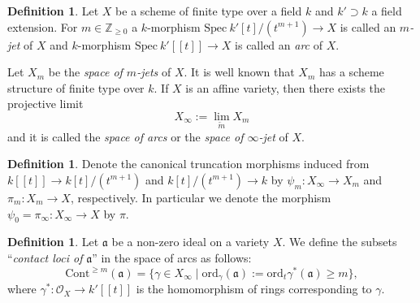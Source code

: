 \documentclass[a4paper]{amsart}
\def\ZZ{{\mathbb{Z}}}
\renewcommand{\a}{{\mathfrak{a}}}
\newcommand{\oo}{{\mathcal O}}
\newcommand{\mld}{{\mathrm{mld}}}
\newcommand{\cont}{{\mathrm{Cont}}}
\newcommand{\ord}{{\mathrm{ord}}}
\newcommand{\spec}{{\mathrm{Spec \ }}}
\newcommand{\m}{{\mathfrak{m}}}
\newcommand{\lct}{{\operatorname{lct}}}
\theoremstyle{definition}
\newtheorem{defn}[thm]{Definition}
\newtheorem{rem}[thm]{Remark}
\begin{document}
   



\begin{defn}
  
 Let \( X \) be a scheme of finite type over a field $k$ and  $k'\supset k$ a field extension.
For  \( m\in \ZZ_{\geq 0} \) a \( k \)-morphism \( \spec k'[t]/(t^{m+1})\to X \) is called an  {\it{\( m \)-jet}} of \( X \) and 
 \( k \)-morphism \( \spec k'[[t]]\to X \) is called an {\sl {arc}} of \( X \).
\end{defn}



Let 
 \( X_{m} \) be the {\sl space of \( m \)-jets} 
   of  \( X \). 
   It is well known that $X_m$ has a scheme structure of finite type over $k$.
   If $X$ is an affine variety, then there exists the projective limit $$X_\infty:=\lim_{\overleftarrow {m}} X_m$$
   and it is called the {\sl space of arcs} or the {\sl space of $\infty$-jet} of $X$.
\begin{defn}
    Denote the canonical truncation morphisms induced from $k[[t]]\to k[t]/(t^{m+1})$ 
    and $k[t]/(t^{m+1})\to k$  by
    $\psi_m: X_\infty\to X_m$ and $\pi_m: X_m\to X$, respectively.
    In particular we denote the  morphism  $\psi_0=\pi_\infty : X_\infty \to X$ by $\pi$.
    
\end{defn}     
 

\begin{defn} Let  $\a$ be a non-zero ideal on 
       a variety $X$.
        We define the subsets ``{\sl contact loci of }$\a$''  in the space of arcs  as follows:
       $$\cont^{\geq m}(\a)=\{\gamma \in X_\infty \mid \ord_\gamma(\a):=\ord_t  
       \gamma^*(\a)\geq m\},$$
%    
       where $\gamma^*:\oo_X\to k'[[t]]$
      is the  homomorphism of rings corresponding to $\gamma$.
\end{defn}
\end{document}
